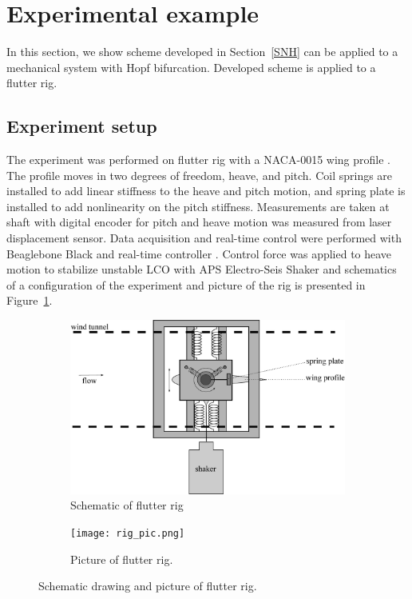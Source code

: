 \documentclass[openacc]{rsproca_new}%
\newcommand{\Sref}[1]{Section~\ref{#1}}
\newcommand{\Fref}[1]{Figure~\ref{#1}}
\begin{document}
\section{Experimental example}
In this section, we show scheme developed in \Sref{SNH} can be applied to a mechanical system with Hopf bifurcation. Developed scheme is applied to a flutter rig.


\subsection{Experiment setup}\label{setup}
The experiment was performed on flutter rig with a NACA-0015 wing profile \cite{jacobs1933characteristics}. The profile moves in two degrees of freedom, heave, and pitch. Coil springs are installed to add linear stiffness to the heave and pitch motion, and spring plate is installed to add nonlinearity on the pitch stiffness. Measurements are taken at shaft with digital encoder for pitch and heave motion was measured from laser displacement sensor. Data acquisition and real-time control were performed with Beaglebone Black and real-time controller \cite{rtc2}. Control force was applied to heave motion to stabilize unstable LCO with APS Electro-Seis Shaker and schematics of a configuration of the experiment and picture of the rig is presented in \Fref{f:rig}.

\begin{figure}
  \centering
  \begin{subfigure}[b]{0.6\linewidth}
    \includegraphics[width=\linewidth]{flutter_rig.eps}
    \caption{Schematic of flutter rig}
  \end{subfigure}
  \begin{subfigure}[b]{0.6\linewidth}
    \texttt{[image: rig\_pic.png]}
    \caption{Picture of flutter rig.}
  \end{subfigure}
  \caption{Schematic drawing and picture of flutter rig.}
  \label{f:rig}
\end{figure}
\end{document}
